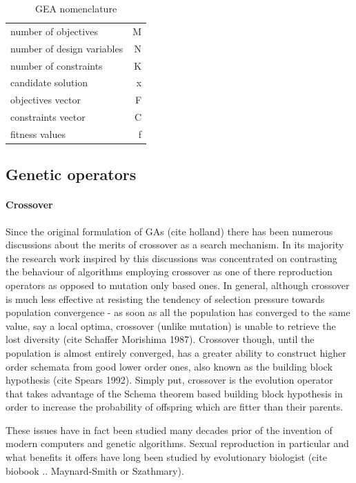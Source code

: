 \begin{table}[htdp]
\centering
\begin{tabular}{lr} 
\hline
\hline
number of objectives & M\\
number of design variables & N\\
number of constraints   & K\\
\hline
candidate solution   & x\\
objectives vector  & F\\
constraints vector  & C\\
fitness values & f\\
\hline
\hline
\end{tabular}
\caption[GEA nomenclature]{GEA nomenclature}
\label{GEA nomenclature} 
\end{table}
\subsection{Genetic operators}
\paragraph{Crossover}
Since the original formulation of GAs (cite holland) there has been numerous discussions about the merits of crossover as a search mechanism. In its majority the research work inspired by this discussions was concentrated on contrasting the behaviour of algorithms employing crossover as one of there reproduction operators as opposed to mutation only based ones. 
In general, although crossover is much less effective at resisting the tendency of selection pressure towards population convergence - as soon as all the population has converged to the same value, say a local optima, crossover (unlike mutation) is unable to retrieve the lost diversity (cite Schaffer Morishima 1987). Crossover though, until the population is almost entirely converged, has a greater ability to construct higher order schemata from good lower order ones, also known as the building block hypothesis (cite Spears 1992).         
Simply put, crossover is the evolution operator that takes advantage of the Schema theorem based building block hypothesis in order to increase the probability of offspring which are fitter than their parents.    

These issues have in fact been studied many decades prior of the invention of modern computers and genetic algorithms. Sexual reproduction in particular and what benefits it offers have long been studied by evolutionary biologist (cite biobook .. Maynard-Smith or Szathmary). 

